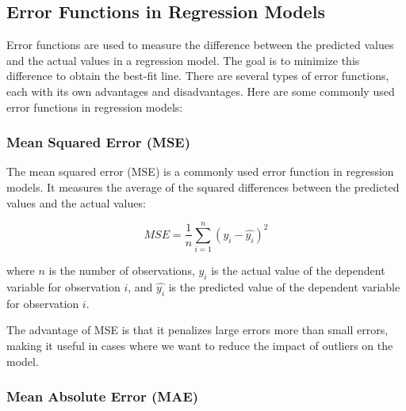 \documentclass{article}
\begin{document}
\subsection{Error Functions in Regression Models}

Error functions are used to measure the difference between the predicted values and the actual values in a regression model. The goal is to minimize this difference to obtain the best-fit line. There are several types of error functions, each with its own advantages and disadvantages. Here are some commonly used error functions in regression models:

\subsubsection{Mean Squared Error (MSE)}
\begin{center}
    \end{center}
The mean squared error (MSE) is a commonly used error function in regression models. It measures the average of the squared differences between the predicted values and the actual values:

\begin{equation}
MSE = \frac{1}{n}\sum_{i=1}^{n}(y_i - \hat{y_i})^2
\end{equation}

where $n$ is the number of observations, $y_i$ is the actual value of the dependent variable for observation $i$, and $\hat{y_i}$ is the predicted value of the dependent variable for observation $i$.

The advantage of MSE is that it penalizes large errors more than small errors, making it useful in cases where we want to reduce the impact of outliers on the model.
\subsubsection{Mean Absolute Error (MAE)}

\begin{center}
\end{center}
\end{document}
